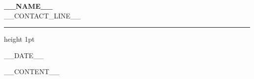 \documentclass[11pt,a4paper]{article}
\begin{document}
\begin{center}
    {\Huge \bfseries \color{primary} __NAME__} \\[4pt]
    {\color{secondary} \small __CONTACT_LINE__}
\end{center}

\vspace{10pt}
\hrule height 1pt
\vspace{15pt}

\hfill {\color{secondary} __DATE__}

\vspace{15pt}

\color{primary}
__CONTENT__
\end{document}
